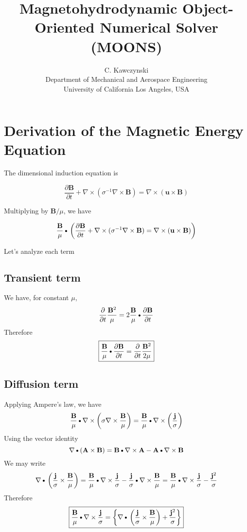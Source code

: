 \documentclass[11pt]{article}
\newcommand{\A}{\mathbf{A}}
\newcommand{\B}{\mathbf{B}}
\newcommand{\PD}{\partial}
\newcommand{\BM}{\frac{\mathbf{B}}{\mu}}
\newcommand{\JS}{\frac{\mathbf{j}}{\sigma}}
\newcommand{\JSS}{\frac{\mathbf{j}^2}{\sigma}}
\newcommand{\U}{\mathbf{u}}
\newcommand{\SII}{\sigma^{-1}}
\newcommand{\SI}{\sigma}
\newcommand{\DOT}{\text{\textbullet}}
\begin{document}
\doublespacing
\title{Magnetohydrodynamic Object-Oriented Numerical Solver (MOONS)}
\author{C. Kawczynski \\
Department of Mechanical and Aerospace Engineering \\
University of California Los Angeles, USA\\
}
\maketitle

\section{Derivation of the Magnetic Energy Equation}
The dimensional induction equation is

\begin{equation}
	\frac{\PD \B}{\PD t} +
	\nabla \times (\SII \nabla \times \B) =
	\nabla \times (\U \times \B)
\end{equation}

Multiplying by $\B / \mu$, we have

\begin{equation}
	\BM \DOT
	\left(
	\frac{\PD \B}{\PD t} +
	\nabla \times (\SII \nabla \times \B) =
	\nabla \times (\U \times \B)
	\right)
\end{equation}

Let's analyze each term

\subsection{Transient term}
We have, for constant $\mu$, 
\begin{equation}
	\frac{\PD}{\PD t} \frac{\B^2}{\mu} = 2 \BM \DOT \frac{\PD \B}{\PD t} 
\end{equation}
Therefore
\begin{equation}
	\boxed{
	\BM \DOT \frac{\PD \B}{\PD t} =
	\frac{\PD}{\PD t} \frac{\B^2}{2 \mu}
	}
\end{equation}
\subsection{Diffusion term}
Applying Ampere's law, we have
\begin{equation}
	\BM \DOT \nabla \times \left( \SI \nabla \times \BM \right) = \BM \DOT \nabla \times \left( \JS \right)
\end{equation}
Using the vector identity
\begin{equation} \label{eq:VI}
	\nabla \DOT (\A \times \B) = \B \DOT \nabla \times \A - \A \DOT \nabla \times \B
\end{equation}
We may write
\begin{equation}
	\nabla \DOT \left(\JS \times \BM \right) = 
	\BM \DOT \nabla \times \JS - \JS \DOT \nabla \times \BM = 
	\BM \DOT \nabla \times \JS - \JSS
\end{equation}
Therefore
\begin{equation}
	\boxed{
	\BM \DOT \nabla \times \JS = 
	\left\{ \nabla \DOT \left(\JS \times \BM \right) + \JSS \right\}
	}
\end{equation}
\end{document}
